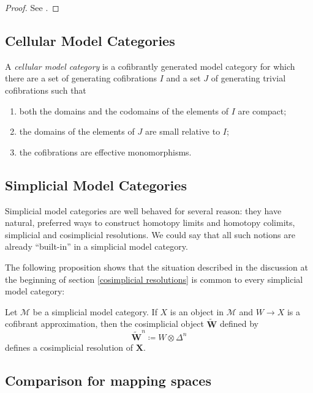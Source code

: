 \begin{refsection}
\begin{proof}
See \cite[Prop. A.2.8.2]{htt}.
\end{proof}

\subsection{Cellular Model Categories}

\begin{defin}
A \emph{cellular model category} is a cofibrantly generated model category for which there are a set of generating cofibrations $I$ and a set $J$ of generating trivial cofibrations such that
\begin{enumerate}
\item both the domains and the codomains of the elements of $I$ are compact;
\item the domains of the elements of $J$ are small relative to $I$;
\item the cofibrations are effective monomorphisms.
\end{enumerate}
\end{defin}

\subsection{Simplicial Model Categories} \label{simplicial model categories}

Simplicial model categories are well behaved for several reason: they have natural, preferred ways to construct homotopy limits and homotopy colimits, simplicial and cosimplicial resolutions. We could say that all such notions are already ``built-in'' in a simplicial model category.

The following proposition shows that the situation described in the discussion at the beginning of section \ref{cosimplicial resolutions} is common to every simplicial model category:

\begin{prop} \label{prop simplicial resolutions simplicial category}
Let $\mathcal M$ be a simplicial model category. If $X$ is an object in $\mathcal M$ and $W \to X$ is a cofibrant approximation, then the cosimplicial object $\widetilde{\mathbf W}$ defined by
\[
\widetilde{\mathbf W}^n\coloneqq W \otimes \Delta^n
\]
defines a cosimplicial resolution of $\mathbf X$.
\end{prop}

\subsection{Comparison for mapping spaces}

\printbibliography[heading = local]

\end{refsection}
